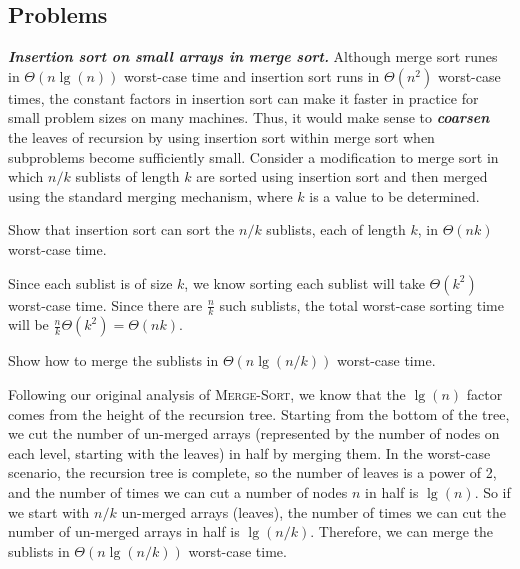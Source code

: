 \documentclass[Chapter02]{subfiles}
\begin{document}
	\subsection*{Problems}

	\begin{problems}
		\item \textbf{\textit{Insertion sort on small arrays in merge sort.}} Although merge sort runes in $\Theta(n \lg(n))$ worst-case time and insertion sort runs in $\Theta(n^2)$ worst-case times, the constant factors in insertion sort can make it faster in practice for small problem sizes on many machines. Thus, it would make sense to \textbf{\textit{coarsen}} the leaves of recursion by using insertion sort within merge sort when subproblems become sufficiently small. Consider a modification to merge sort in which $n / k$ sublists of length $k$ are sorted using insertion sort and then merged using the standard merging mechanism, where $k$ is a value to be determined.
		\begin{problems}
			\item Show that insertion sort can sort the $n / k$ sublists, each of length $k$, in $\Theta(nk)$ worst-case time.
			\begin{answer}
				Since each sublist is of size $k$, we know sorting each sublist will take $\Theta(k^2)$ worst-case time. Since there are $\frac{n}{k}$ such sublists, the total worst-case sorting time will be $\frac{n}{k} \Theta(k^2) = \Theta(nk)$.
			\end{answer}

			\item Show how to merge the sublists in $\Theta(n \lg(n / k))$ worst-case time.
			\begin{answer}
				Following our original analysis of \textsc{Merge-Sort}, we know that the $\lg(n)$ factor comes from the height of the recursion tree. Starting from the bottom of the tree, we cut the number of un-merged arrays (represented by the number of nodes on each level, starting with the leaves) in half by merging them. In the worst-case scenario, the recursion tree is complete, so the number of leaves is a power of 2, and the number of times we can cut a number of nodes $n$ in half is $\lg(n)$. So if we start with $n / k$ un-merged arrays (leaves), the number of times we can cut the number of un-merged arrays in half is $\lg(n / k)$. Therefore, we can merge the sublists in $\Theta(n \lg(n / k))$ worst-case time.
			\end{answer}
			

\end{problems}
\end{problems}
\end{document}
